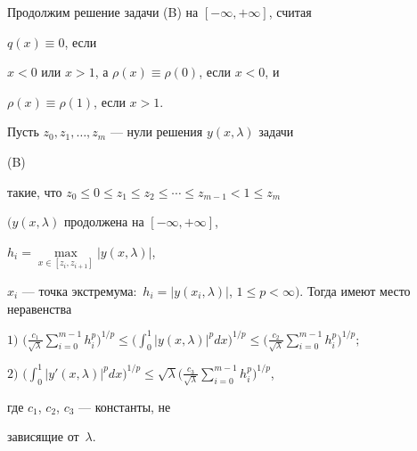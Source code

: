 \smallskip


 


Продолжим решение задачи (B) на $[-\infty,+\infty]$, считая 


$q(x)\equiv0$, если 


$x<0$ или $x>1$, а $\rho(x)\equiv\rho(0)$, если $x<0$, и 


$\rho(x)\equiv\rho(1)$, если $x>1$. 


 


\begin{lem} 


Пусть $z_0,z_1,\dotsc,z_m$ --- нули решения $y(x,\lambda)$ задачи {\em 


(B)} такие, что $z_0\le 0\le z_1\le z_2\le\dotsb\le z_{m-1}<1\le z_m$ 


$(y(x,\lambda)$ продолжена на $[-\infty,+\infty]$, 


$h_i=\max\limits_{x\in[z_i,z_{i+1}]}|y(x,\lambda)|$, 


$x_i$ --- точка экстремума\/${:}$ $h_i=|y(x_i,\lambda)|$, $1\le 


p<\infty)$. Тогда имеют место неравенства 


 


$1)$ $\displaystyle{\bigg(\frac{c_1}{\sqrt{\lambda}} \sum^{m-1}_{i=0} 


h^p_i\bigg)^{1/p}\le \bigg(\int^1_0|y(x,\lambda)|^p dx \bigg)^{1/p} 


\le\bigg(\frac{c_2}{\sqrt{\lambda}}\sum^{m-1}_{i=0}h^p_i \bigg)^{1/p};}$ 


 


$2)$ $\displaystyle{\bigg(\int^1_0|y'(x,\lambda)|^p dx \bigg)^{1/p} 


\le\sqrt{\lambda}\bigg(\frac{c_3}{\sqrt{\lambda}}\sum^{m-1}_{i=0} 


h^p_i\bigg)^{1/p}}$, 


где $c_1$, $c_2$, $c_3$ --- константы, не 


зависящие от~$\lambda$. 


\end{lem} 


 


